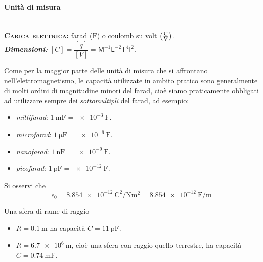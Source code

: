\paragraph{Unità di misura}
\begin{units}~\\
	\textbf{\textsc{Carica elettrica:}} farad  ($\unit{\farad}$) o coulomb su volt $\left(\unit[per-mode = fraction]{\coulomb\per\volt}\right)$.\\
	\textit{\textbf{Dimensioni:}} $[C]=\dfrac{[q]}{[V]}=\mathsf{M}^{-1}\mathsf{L}^{-2}\mathsf{T}^4\mathsf{I}^2$.
\end{units}
Come per la maggior parte delle unità di misura che si affrontano nell'elettromagnetismo, le capacità utilizzate in ambito pratico sono generalmente di molti ordini di magnitudine minori del farad, cioè siamo praticamente obbligati ad utilizzare sempre dei \textit{sottomultipli} del farad, ad esempio:
\begin{itemize}
	\item \textit{millifarad}: $\SI[per-mode = fraction,exponent-product=\ensuremath{\cdot}]{1}{\milli\farad}=\SI[per-mode = fraction,exponent-product=\ensuremath{\cdot}]{e-3}{\farad}$.
	\item \textit{microfarad}: $\SI[per-mode = fraction,exponent-product=\ensuremath{\cdot}]{1}{\micro\farad}=\SI[per-mode = fraction,exponent-product=\ensuremath{\cdot}]{e-6}{\farad}$.
	\item \textit{nanofarad}: $\SI[per-mode = fraction,exponent-product=\ensuremath{\cdot}]{1}{\nano\farad}=\SI[per-mode = fraction,exponent-product=\ensuremath{\cdot}]{e-9}{\farad}$.
	\item \textit{picofarad}: $\SI[per-mode = fraction,exponent-product=\ensuremath{\cdot}]{1}{\pico\farad}=\SI[per-mode = fraction,exponent-product=\ensuremath{\cdot}]{e-12}{\farad}$.
\end{itemize}
\begin{observe}
		Si osservi che
	\begin{equation*}
		\epsilon_0=\SI[per-mode = fraction,exponent-product=\ensuremath{\cdot}]{8,854e-12}{\square\coulomb\per\newton\square\metre}=\SI[per-mode = fraction,exponent-product=\ensuremath{\cdot}]{8,854e-12}{\farad\per\metre}
	\end{equation*}
\end{observe}
\begin{example}
	Una sfera di rame di raggio
	\begin{itemize}
		\item $R=\SI{0,1}{\metre}$ ha capacità $C=\SI[per-mode = fraction,exponent-product=\ensuremath{\cdot}]{11}{\pico\farad}$.
		\item $R=\SI[exponent-product=\ensuremath{\cdot}]{6,7e6}{\metre}$, cioè una sfera con raggio quello terrestre, ha capacità $C=\SI[per-mode = fraction,exponent-product=\ensuremath{\cdot}]{0,74}{\milli\farad}$.
	\end{itemize}
\end{example}
